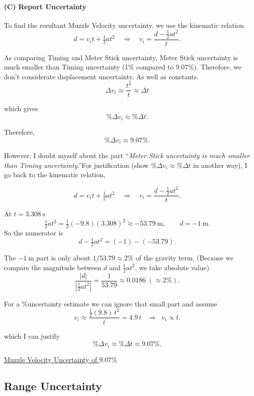 \documentclass[12pt]{article}
\begin{document}
\paragraph{(C) Report Uncertainty}
To find the resultant Muzzle Velocity uncertainty, we use the kinematic relation
\[
d = v_i t + \tfrac12 a t^2 \quad\Rightarrow\quad
v_i = \frac{d - \tfrac12 a t^2}{t}.
\]

\vspace{1em}
As comparing Timing and Meter Stick uncertainty, 
Meter Stick uncertainty is much smaller than Timing uncertainty (1\% compared to 9.07\%). 
Therefore, we don't considerate displacement uncertainty. As well as constants.
\[
\Delta v_i \approx \frac{t^2}{t} \approx \Delta t
\]

which gives 
\[
\%\Delta v_i \approx \%\Delta t.
\]

Therefore, 
\[
\%\Delta v_i \approx 9.07\%.
\]
\vspace{1em}

However, I doubt myself about the part ``\emph{Meter Stick uncertainty is much smaller than Timing uncertainty}.''For justification (show $\%\Delta v_i \approx \%\Delta t$ in another way), I go back to the kinematic relation,

\[
d = v_i t + \tfrac12 a t^2 \quad\Rightarrow\quad
v_i = \frac{d - \tfrac12 a t^2}{t}.
\]

At $t=3.308~\mathrm{s}$
\[
\tfrac12 a t^2 = \tfrac12(-9.8)(3.308)^2 \approx -53.79~\mathrm{m},\qquad d=-1~\mathrm{m}.
\]
\vspace{1em}
So the numerator is
\[
d-\tfrac12 a t^2 = (-1)-(-53.79).
\]

The $-1~\mathrm{m}$ part is only about $1/53.79\approx 2\%$ of the gravity term. (Because we compare the magnitude between $d$ and $\tfrac12 a t^2$, we take absolute value)
\[
\frac{|d|}{\left|\tfrac{1}{2} a t^2\right|}
= \frac{1}{53.79}
\approx 0.0186 \; (\approx 2\%).
\]

For a $\%$uncertainty estimate we can ignore that small part and assume
\[
v_i \approx \frac{ \tfrac12(9.8)\,t^2 }{t} = 4.9\,t  \;\;\;\Rightarrow\;\; v_i \propto t.
\]

which I can justify
\[
\%\Delta v_i \approx  \%\Delta t \approx \boxed{9.07\%}.
\]

\vspace{1em}

\noindent\hfill\underline{Muzzle Velocity Uncertainty of $9.07\%$}


\subsection{Range Uncertainty}
\end{document}
